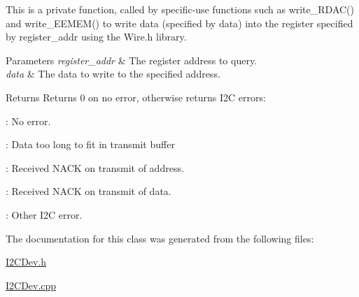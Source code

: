 This is a private function, called by specific-\/use functions such as {\ttfamily write\+\_\+\+R\+D\+A\+C()} and {\ttfamily write\+\_\+\+E\+E\+M\+E\+M()} to write data (specified by {\ttfamily data}) into the register specified by {\ttfamily register\+\_\+addr} using the Wire.\+h library.


\begin{DoxyParams}{Parameters}
{\em register\+\_\+addr} & The register address to query. \\
\hline
{\em data} & The data to write to the specified address.\\
\hline
\end{DoxyParams}
\begin{DoxyReturn}{Returns}
Returns 0 on no error, otherwise returns I2\+C errors\+:
\begin{DoxyItemize}
\item {}\+: No error.
\item {}\+: Data too long to fit in transmit buffer
\item {}\+: Received N\+A\+C\+K on transmit of address.
\item {}\+: Received N\+A\+C\+K on transmit of data.
\item {}\+: Other I2\+C error.
\end{DoxyItemize}
\end{DoxyReturn}


The documentation for this class was generated from the following files\+:\begin{DoxyCompactItemize}
\item 
\hyperlink{_i2_c_dev_8h}{I2\+C\+Dev.\+h}\item 
\hyperlink{_i2_c_dev_8cpp}{I2\+C\+Dev.\+cpp}\end{DoxyCompactItemize}
